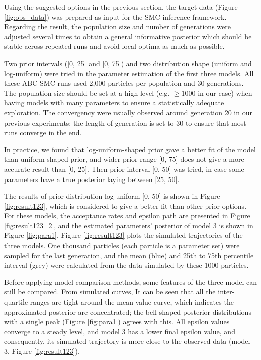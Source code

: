 Using the suggested options in the previous section, the target data (Figure \ref{fig:obs_data}) was prepared as input for the SMC inference framework. Regarding the result, the population size and number of generations were adjusted several times to obtain a general informative posterior which should be stable across repeated runs and avoid local optima as much as possible.

Two prior intervals ([0, 25] and [0, 75]) and two distribution shape (uniform and log-uniform) were tried in the parameter estimation of the first three models. All these ABC SMC runs used 2,000 particles per population and 30 generations. The population size should be set at a high level (e.g. $\geq 1000$ in our case) when having models with many parameters to ensure a statistically adequate exploration. The convergency were usually observed around generation 20 in our previous experiments; the length of generation is set to 30 to ensure that most runs converge in the end. 

In practice, we found that log-uniform-shaped prior gave a better fit of the model than uniform-shaped prior, and wider prior range [0, 75] does not give a more accurate result than [0, 25]. Then prior interval [0, 50] was tried, in case some parameters have a true posterior laying between [25, 50].

The results of prior distribution log-uniform [0, 50] is shown in Figure \ref{fig:result123}, which is considered to give a better fit than other prior options. For these models, the acceptance rates and epsilon path are presented in Figure \ref{fig:result123_2}, and the estimated parameters' posterior of model 3 is shown in Figure \ref{fig:para1}. Figure \ref{fig:result123} plots the simulated trajectories of the three models. One thousand particles (each particle is a parameter set) were sampled for the last generation, and the mean (blue) and 25th to 75th percentile interval (grey) were calculated from the data simulated by these 1000 particles.

Before applying model comparison methods, some features of the three model can still be compared. From simulated curves, It can be seen that all the inter-quartile ranges are tight around the mean value curve, which indicates the approximated posterior are concentrated; the bell-shaped posterior distributions with a single peak (Figure \ref{fig:para1}) agrees with this. All epsilon values converge to a steady level, and model 3 has a lower final epsilon value, and consequently, its simulated trajectory is more close to the observed data (model 3, Figure \ref{fig:result123}).

